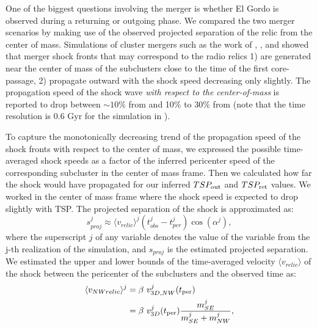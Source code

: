 \documentclass[ucdthesis.tex]{subfiles}
\begin{document}
    One of the biggest questions involving the merger is whether El Gordo is
    observed during a returning or outgoing phase. We compared the two merger
    scenarios by making use of the observed projected separation of the relic from the
    center of mass.
    Simulations of cluster mergers such as the work of \citet{Paul2011b},
    \citet{VanWeerenRJ2011}, and \citet{Springel2007} showed that merger shock
    fronts that may correspond to the radio relics 1) are generated near the
    center of mass of the subclusters close to the time of the first
    core-passage, 2) propagate outward with the shock speed decreasing only slightly.
    The propagation speed of the shock wave {\it with respect to the
    center-of-mass} is reported 
    to drop between $\sim 10\%$ from \citet{Springel2007} and  
    10\% to 30\% from \citet{Paul2011b} (note that the   
     time resolution is 0.6 Gyr for the simulation in \citealt{Paul2011b}).
    \par 
    To capture the monotonically decreasing trend of the
    propagation speed of the shock fronts with respect to the center of
    mass, we expressed the possible time-averaged shock speeds as a factor of the inferred
    pericenter speed of the corresponding subcluster in the center of mass
     frame. 
    Then we calculated how far the shock would have propagated for our inferred
    $TSP_{\rm out}$ and $TSP_{\rm ret}$ values. We worked in the center of mass frame where the
    shock speed is expected to drop slightly with TSP. 
    The projected separation of the shock is approximated as:
    \begin{equation}
    	s^j_{proj} \approx \langle v_{relic} \rangle^j (t^j_{obs} - t^j_{per})
    	\cos(\alpha^j),
    	\label{eq:proj_s_model}
    \end{equation}
    where the superscript $j$ of any variable denotes the value of the
    variable from the j-th realization of the simulation, and $s_{proj}$ is the estimated projected
    separation. We estimated the upper and lower bounds of the time-averaged velocity
    $\langle v_{relic} \rangle$ of the shock between
    the pericenter of the subclusters and the observed time as:  
    \begin{align}
    	\label{eqn:NW_speed}
    	\langle v_{NW relic} \rangle^j &= \beta~v^j_{3D, NW}(t_{\rm per}) \\
    	&= \beta~v^j_{3D}(t_{\rm per}) \frac{m^j_{SE}}{m^j_{SE} + m^j_{NW}}, 
    \end{align}
\end{document}
